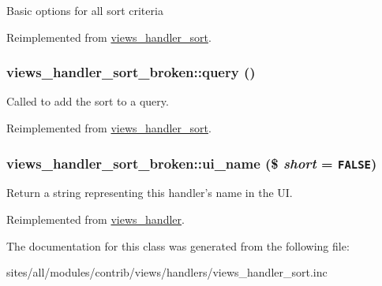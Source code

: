 Basic options for all sort criteria 

Reimplemented from \hyperlink{classviews__handler__sort_ba953218e09ab9da8f6ed0a67f046455}{views\_\-handler\_\-sort}.\hypertarget{classviews__handler__sort__broken_6298719637ac590b81496b4487b573ea}{
\subsubsection[{query}]{\setlength{\rightskip}{0pt plus 5cm}views\_\-handler\_\-sort\_\-broken::query ()}}
\label{classviews__handler__sort__broken_6298719637ac590b81496b4487b573ea}


Called to add the sort to a query. 

Reimplemented from \hyperlink{classviews__handler__sort_94fa33c5d037e41a927583fce2df3d18}{views\_\-handler\_\-sort}.\hypertarget{classviews__handler__sort__broken_d83cfcffa971a65b6e306d6fac7f6c10}{
\subsubsection[{ui\_\-name}]{\setlength{\rightskip}{0pt plus 5cm}views\_\-handler\_\-sort\_\-broken::ui\_\-name (\$ {\em short} = {\tt FALSE})}}
\label{classviews__handler__sort__broken_d83cfcffa971a65b6e306d6fac7f6c10}


Return a string representing this handler's name in the UI. 

Reimplemented from \hyperlink{classviews__handler_e81019ed08d9c3f5bca3d16c69e7b39f}{views\_\-handler}.

The documentation for this class was generated from the following file:\begin{CompactItemize}
\item 
sites/all/modules/contrib/views/handlers/views\_\-handler\_\-sort.inc\end{CompactItemize}
